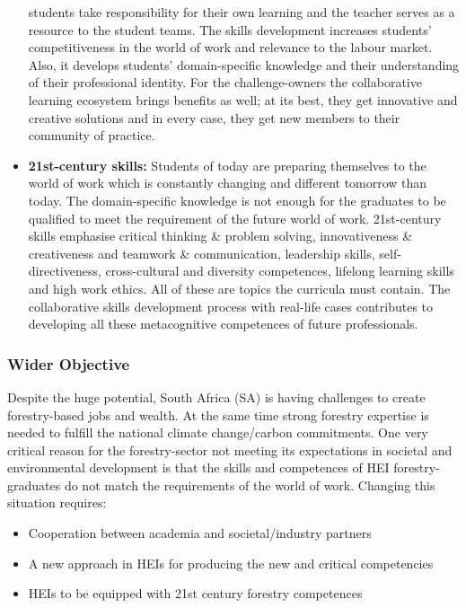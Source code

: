 \documentclass[
  11pt,
]{article}
\begin{document}
\begin{itemize}
  students take responsibility for their own learning and the teacher
  serves as a resource to the student teams. The skills development
  increases students' competitiveness in the world of work and relevance
  to the labour market. Also, it develops students' domain-specific
  knowledge and their understanding of their professional identity. For
  the challenge-owners the collaborative learning ecosystem brings
  benefits as well; at its best, they get innovative and creative
  solutions and in every case, they get new members to their community
  of practice.
\item
  \textbf{21st-century skills:} Students of today are preparing
  themselves to the world of work which is constantly changing and
  different tomorrow than today. The domain-specific knowledge is not
  enough for the graduates to be qualified to meet the requirement of
  the future world of work. 21st-century skills emphasise critical
  thinking \& problem solving, innovativeness \& creativeness and
  teamwork \& communication, leadership skills, self-directiveness,
  cross-cultural and diversity competences, lifelong learning skills and
  high work ethics. All of these are topics the curricula must contain.
  The collaborative skills development process with real-life cases
  contributes to developing all these metacognitive competences of
  future professionals.
\end{itemize}

\hypertarget{wider-objective}{%
\subsubsection{Wider Objective}\label{wider-objective}}

Despite the huge potential, South Africa (SA) is having challenges to
create forestry-based jobs and wealth. At the same time strong forestry
expertise is needed to fulfill the national climate change/carbon
commitments. One very critical reason for the forestry-sector not
meeting its expectations in societal and environmental development is
that the skills and competences of HEI forestry-graduates do not match
the requirements of the world of work. Changing this situation requires:

\begin{itemize}
\item
  Cooperation between academia and societal/industry partners
\item
  A new approach in HEIs for producing the new and critical competencies
\item
  HEIs to be equipped with 21st century forestry competences
\end{itemize}
\end{document}
